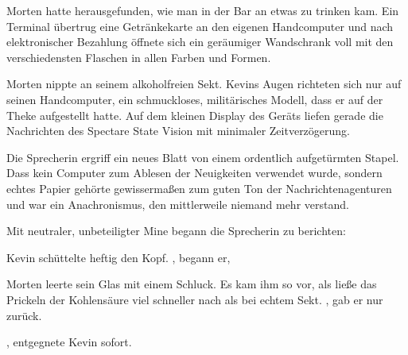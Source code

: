 \par

Morten hatte herausgefunden, wie man in der Bar an etwas zu trinken kam. Ein Terminal übertrug eine Getränkekarte an den eigenen Handcomputer und nach elektronischer Bezahlung öffnete sich ein geräumiger Wandschrank voll mit den verschiedensten Flaschen in allen Farben und Formen.

\par

Morten nippte an seinem alkoholfreien Sekt. Kevins Augen richteten sich nur auf seinen Handcomputer, ein schmuckloses, militärisches Modell, dass er auf der Theke aufgestellt hatte. Auf dem kleinen Display des Geräts liefen gerade die Nachrichten des Spectare State Vision mit minimaler Zeitverzögerung.

\par

Die Sprecherin ergriff ein neues Blatt von einem ordentlich aufgetürmten Stapel. Dass kein Computer zum Ablesen der Neuigkeiten verwendet wurde, sondern echtes Papier gehörte gewissermaßen zum guten Ton der Nachrichtenagenturen und war ein Anachronismus, den mittlerweile niemand mehr verstand.

\par

Mit neutraler, unbeteiligter Mine begann die Sprecherin zu berichten: 

\par

Kevin schüttelte heftig den Kopf. , begann er, 

\par

Morten leerte sein Glas mit einem Schluck. Es kam ihm so vor, als ließe das Prickeln der Kohlensäure viel schneller nach als bei echtem Sekt. , gab er nur zurück.

\par

, entgegnete Kevin sofort. 

